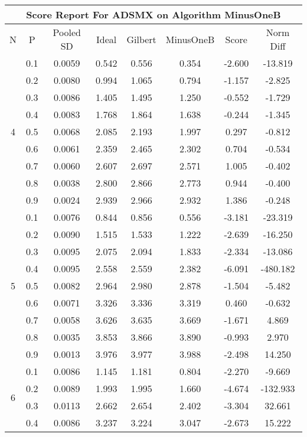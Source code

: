 \documentclass[11pt,a4paper]{report}
\begin{document}
\begin{longtable}{ | c | c || c | c | c | c | c | c | }
\hline
\multicolumn{8}{|c|}{ Score Report For ADSMX on Algorithm MinusOneB} \\
\hline
N & P & Pooled SD &  Ideal &  Gilbert & MinusOneB  & Score & Norm Diff \\
 \hline
 \hline
 \endhead
\multirow{9}{*}{4} & 0.1 & 0.0059 & 0.542 & 0.556 & 0.354 & -2.600 & -13.819 \\
 & 0.2 & 0.0080 & 0.994 & 1.065 & 0.794 & -1.157 & -2.825 \\
 & 0.3 & 0.0086 & 1.405 & 1.495 & 1.250 & -0.552 & -1.729 \\
 & 0.4 & 0.0083 & 1.768 & 1.864 & 1.638 & -0.244 & -1.345 \\
 & 0.5 & 0.0068 & 2.085 & 2.193 & 1.997 & 0.297 & -0.812 \\
 & 0.6 & 0.0061 & 2.359 & 2.465 & 2.302 & 0.704 & -0.534 \\
 & 0.7 & 0.0060 & 2.607 & 2.697 & 2.571 & 1.005 & -0.402 \\
 & 0.8 & 0.0038 & 2.800 & 2.866 & 2.773 & 0.944 & -0.400 \\
 & 0.9 & 0.0024 & 2.939 & 2.966 & 2.932 & 1.386 & -0.248 \\
 \hline
\multirow{9}{*}{5} & 0.1 & 0.0076 & 0.844 & 0.856 & 0.556 & -3.181 & -23.319 \\
 & 0.2 & 0.0090 & 1.515 & 1.533 & 1.222 & -2.639 & -16.250 \\
 & 0.3 & 0.0095 & 2.075 & 2.094 & 1.833 & -2.334 & -13.086 \\
 & 0.4 & 0.0095 & 2.558 & 2.559 & 2.382 & -6.091 & -480.182 \\
 & 0.5 & 0.0082 & 2.964 & 2.980 & 2.878 & -1.504 & -5.482 \\
 & 0.6 & 0.0071 & 3.326 & 3.336 & 3.319 & 0.460 & -0.632 \\
 & 0.7 & 0.0058 & 3.626 & 3.635 & 3.669 & -1.671 & 4.869 \\
 & 0.8 & 0.0035 & 3.853 & 3.866 & 3.890 & -0.993 & 2.970 \\
 & 0.9 & 0.0013 & 3.976 & 3.977 & 3.988 & -2.498 & 14.250 \\
 \hline
\multirow{9}{*}{6} & 0.1 & 0.0086 & 1.145 & 1.181 & 0.804 & -2.270 & -9.669 \\
 & 0.2 & 0.0089 & 1.993 & 1.995 & 1.660 & -4.674 & -132.933 \\
 & 0.3 & 0.0113 & 2.662 & 2.654 & 2.402 & -3.304 & 32.661 \\
 & 0.4 & 0.0086 & 3.237 & 3.224 & 3.047 & -2.673 & 15.222 \\

\end{longtable}
\end{document}
